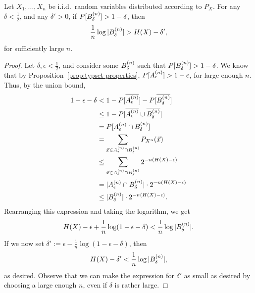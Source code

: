 \begin{theorem}
Let $X_1, ..., X_n$ be i.i.d.\ random variables distributed according to $P_X$. For any $\delta < \frac{1}{2}$, and any $\delta' > 0$, if $P[B_{\delta}^{(n)}] > 1 - \delta$, then
\[
\frac{1}{n} \log |B_{\delta}^{(n)}| > H(X) - \delta',
\]
for sufficiently large $n$.
\end{theorem}
\begin{proof}
Let $\delta,\epsilon < \frac{1}{2}$, and consider some $B_{\delta}^{(n)}$ such that $P[B_{\delta}^{(n)}] > 1 - \delta$. We know that by Proposition~\ref{prop:typset-properties}, $P[A_{\epsilon}^{(n)}] > 1 - \epsilon$, for large enough $n$. Thus, by the union bound,
\begin{align}
1 - \epsilon - \delta &< 1 - P[\overline{A_{\epsilon}^{(n)}}] - P[\overline{B_{\delta}^{(n)}}]\nonumber\\
&\leq 1-P[\overline{A_{\epsilon}^{(n)}} \cup \overline{B_{\delta}^{(n)}}]\nonumber\\
&= P[A_{\epsilon}^{(n)} \cap B_{\delta}^{(n)}]\nonumber\\
&= \sum_{\vec{x} \in A_{\epsilon}^{(n)} \cap B_{\delta}^{(n)}} P_{X^n}(\vec{x})\nonumber\\
&\leq \sum_{\vec{x} \in A_{\epsilon}^{(n)} \cap B_{\delta}^{(n)}} 2^{-n(H(X) - \epsilon)}\nonumber\\
&= |A_{\epsilon}^{(n)} \cap B_{\delta}^{(n)}| \cdot 2^{-n(H(X) - \epsilon)}\nonumber\\
&\leq |B_{\delta}^{(n)}| \cdot 2^{-n(H(X) - \epsilon)}.
\end{align}
Rearranging this expression and taking the logarithm, we get
\begin{align}
H(X) - \epsilon + \frac{1}{n} \log (1 - \epsilon - \delta) < \frac{1}{n} \log |B_{\delta}^{(n)}|.
\end{align}
If we now set $\delta' := \epsilon - \frac{1}{n} \log (1 - \epsilon - \delta)$, then
\begin{align}
H(X) - \delta' < \frac{1}{n} \log |B_{\delta}^{(n)}|,
\end{align}
as desired. Observe that we can make the expression for $\delta'$ as small as desired by choosing a large enough $n$, even if $\delta$ is rather large.
\end{proof}



